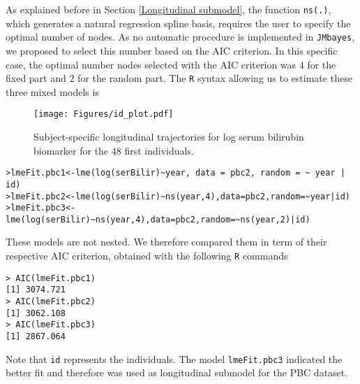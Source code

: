 \documentclass[12pt]{article}
\begin{document}
As explained before in Section \ref{Longitudinal submodel}, the function \texttt{ns(.)}, which generates a natural regression spline basis, requires the user to specify the optimal number of nodes. As no automatic procedure is implemented in \texttt{JMbayes}, we proposed to select this number based on the AIC criterion. In this specific case, the optimal number nodes selected with the AIC criterion was $4$ for the fixed part and $2$ for the random part. The \texttt{R} syntax allowing us to estimate these three mixed models is
\begin{figure}[!tb]
\centering
\texttt{[image: Figures/id\_plot.pdf]}
\caption{Subject-specific longitudinal trajectories for log serum bilirubin biomarker for the $48$ first individuals.}
\label{id_plot}
\end{figure}
\begin{verbatim}
>lmeFit.pbc1<-lme(log(serBilir)~year, data = pbc2, random = ~ year | id)
>lmeFit.pbc2<-lme(log(serBilir)~ns(year,4),data=pbc2,random=~year|id)
>lmeFit.pbc3<-lme(log(serBilir)~ns(year,4),data=pbc2,random=~ns(year,2)|id)
\end{verbatim}
These models are not nested. We therefore compared them in term of their respective AIC criterion, obtained with the following \texttt{R} commands
\begin{verbatim}
> AIC(lmeFit.pbc1)
[1] 3074.721
> AIC(lmeFit.pbc2)
[1] 3062.108
> AIC(lmeFit.pbc3)
[1] 2867.064
\end{verbatim}
Note that \texttt{id} represents the individuals.
The model \texttt{lmeFit.pbc3} indicated the better fit and therefore was used as longitudinal submodel for the PBC dataset.

%
%
%
%
\end{document}

